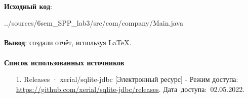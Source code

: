 \documentclass[12pt, a4paper, simple]{eskdtext}
\begin{document}
    \paragraph{} \textbf{Исходный код}: 

    
    {../sources/6sem_SPP_lab3/src/com/company/Main.java}


    \paragraph{} \textbf{Вывод}: создали отчёт, используя \LaTeX.

    \newpage
    \paragraph{} \textbf{Список использованных источников}
    \begin{enumerate}
        \item[1.] Releases · xerial/sqlite-jdbc [Электронный ресурс]
        - Режим доступа: \url{https://github.com/xerial/sqlite-jdbc/releases}.
        Дата~доступа:~02.05.2022.
    \end{enumerate}
    \newpage
\end{document}
